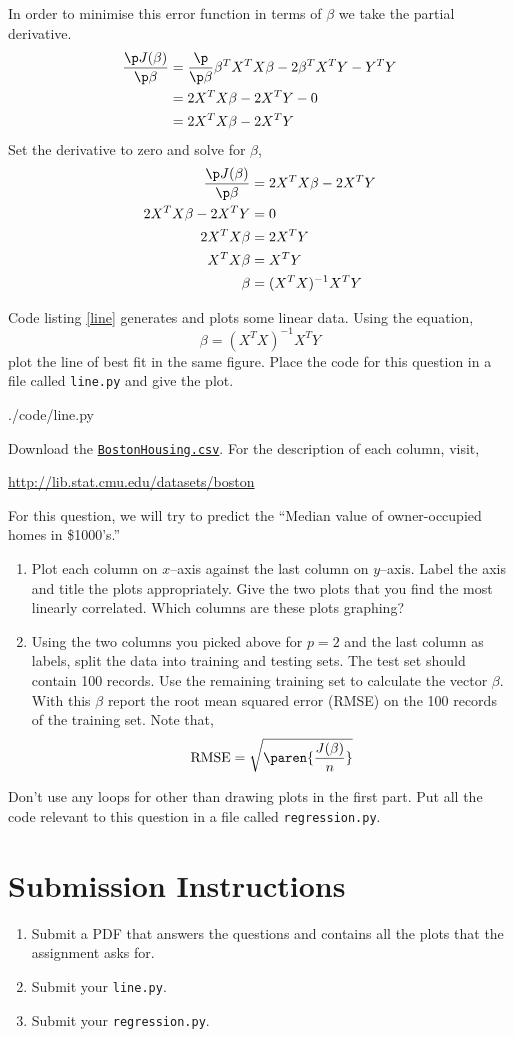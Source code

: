 \documentclass{homework}
\begin{document}
In order to minimise this error function in terms of $\beta$ we take the partial derivative.
\begin{align*}
  \frac{\p J(\beta)}{\p \beta} &= \frac{\p}{\p \beta}\beta^TX^TX\beta - 2\beta^TX^TY - Y^TY \\
  &= 2X^TX\beta - 2X^TY - 0 \\
  &= 2X^TX\beta - 2X^TY
\end{align*}
Set the derivative to zero and solve for $\beta$,
\begin{align*}
  \frac{\p J(\beta)}{\p \beta} &= 2X^TX\beta - 2X^TY \\  
  2X^TX\beta - 2X^TY &= 0 \\
  2X^TX\beta &= 2X^TY \\
  X^TX\beta &= X^TY \\
  \beta &= (X^TX)^{-1}X^TY \\
\end{align*}

\question Code listing \ref{line} generates and plots some linear data. Using the equation,
\[
    \beta = (X^TX)^{-1}X^TY
\]
plot the line of best fit in the same figure. Place the code for this question in a file called \texttt{line.py} and give the plot.

{./code/line.py}

\question Download the \href{https://github.com/selva86/datasets/blob/master/BostonHousing.csv}{\texttt{BostonHousing.csv}}. For the description of each column, visit,

\url{http://lib.stat.cmu.edu/datasets/boston}

For this question, we will try to predict the ``Median value of owner-occupied homes in \$1000's.''
\begin{enumerate}
    \item Plot each column on $x$--axis against the last column on $y$--axis. Label the axis and title the plots appropriately. Give the two plots that you find the most linearly correlated. Which columns are these plots graphing?
    \item Using the two columns you picked above for $p=2$ and the last column as labels, split the data into training and testing sets. The test set should contain 100 records. Use the remaining training set to calculate the vector $\beta$. With this $\beta$ report the root mean squared error (RMSE) on the 100 records of the training set. Note that,
\[
    \text{RMSE} = \sqrt{\paren{\frac{J(\beta)}{n}}}
\]
\end{enumerate}
Don't use any loops for other than drawing plots in the first part. Put all the code relevant to this question in a file called \texttt{regression.py}.

\section*{Submission Instructions}

\begin{enumerate}
    \item Submit a PDF that answers the questions and contains all the plots that the assignment asks for.
    \item Submit your \texttt{line.py}.
    \item Submit your \texttt{regression.py}.
\end{enumerate}
\end{document}

